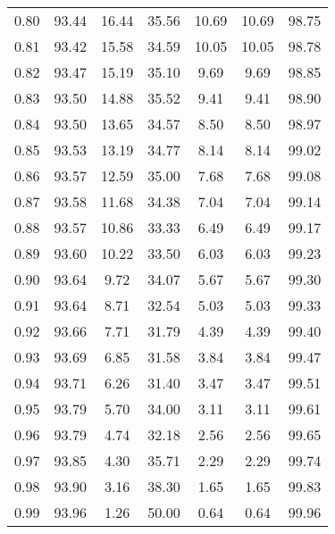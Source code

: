 \begin{tabular}{|c|c|c|c|c|c|c|}
      0.80 &     93.44 &     16.44 &      35.56 &   10.69 &      10.69 &         98.75 \\
      0.81 &     93.42 &     15.58 &      34.59 &   10.05 &      10.05 &         98.78 \\
      0.82 &     93.47 &     15.19 &      35.10 &    9.69 &       9.69 &         98.85 \\
      0.83 &     93.50 &     14.88 &      35.52 &    9.41 &       9.41 &         98.90 \\
      0.84 &     93.50 &     13.65 &      34.57 &    8.50 &       8.50 &         98.97 \\
      0.85 &     93.53 &     13.19 &      34.77 &    8.14 &       8.14 &         99.02 \\
      0.86 &     93.57 &     12.59 &      35.00 &    7.68 &       7.68 &         99.08 \\
      0.87 &     93.58 &     11.68 &      34.38 &    7.04 &       7.04 &         99.14 \\
      0.88 &     93.57 &     10.86 &      33.33 &    6.49 &       6.49 &         99.17 \\
      0.89 &     93.60 &     10.22 &      33.50 &    6.03 &       6.03 &         99.23 \\
      0.90 &     93.64 &      9.72 &      34.07 &    5.67 &       5.67 &         99.30 \\
      0.91 &     93.64 &      8.71 &      32.54 &    5.03 &       5.03 &         99.33 \\
      0.92 &     93.66 &      7.71 &      31.79 &    4.39 &       4.39 &         99.40 \\
      0.93 &     93.69 &      6.85 &      31.58 &    3.84 &       3.84 &         99.47 \\
      0.94 &     93.71 &      6.26 &      31.40 &    3.47 &       3.47 &         99.51 \\
      0.95 &     93.79 &      5.70 &      34.00 &    3.11 &       3.11 &         99.61 \\
      0.96 &     93.79 &      4.74 &      32.18 &    2.56 &       2.56 &         99.65 \\
      0.97 &     93.85 &      4.30 &      35.71 &    2.29 &       2.29 &         99.74 \\
      0.98 &     93.90 &      3.16 &      38.30 &    1.65 &       1.65 &         99.83 \\
      0.99 &     93.96 &      1.26 &      50.00 &    0.64 &       0.64 &         99.96 \\
\bottomrule
\end{tabular}
